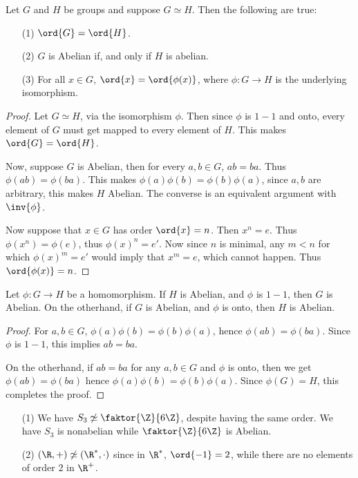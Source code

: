 \begin{lemma}\label{1.6.3}
    Let $G$ and  $H$ be groups and suppose  $G \simeq H$. Then the following are
    true:
    \begin{enumerate}
        \item[(1)] $\ord{G}=\ord{H}$.

        \item[(2)] $G$ is Abelian if, and only if  $H$ is abelian.

        \item [(3)] For all $x \in G$,  $\ord{x}=\ord{\phi(x)}$, where $\phi:G
            \rightarrow H$ is the underlying isomorphism.
    \end{enumerate}
\end{lemma}
\begin{proof}
    Let $G \simeq H$,  via the isomorphism  $\phi$. Then since $\phi$ is  $1-1$
    and onto, every element of  $G$ must get mapped to every element of  $H$.
    This makes  $\ord{G}=\ord{H}$.

    Now, suppose $G$ is Abelian, then for every  $a, b \in G$,  $ab=ba$. Thus
    $\phi(ab)=\phi(ba)$. This makes $\phi(a)\phi(b)=\phi(b)\phi(a)$, since $a,b$
    are arbitrary, this makes  $H$ Abelian. The converse is an equivalent
    argument with  $\inv{\phi}$.

    Now suppose that $x \in G$ has order  $\ord{x}=n$. Then $x^n=e$. Thus
    $\phi(x^n)=\phi(e)$, thus $\phi(x)^n=e'$. Now since $n$ is minimal, any
    $m<n$ for which  $\phi(x)^m=e'$ would imply that $x^m=e$, which cannot
    happen. Thus  $\ord{\phi(x)}=n$.
\end{proof}
\begin{corollary}
    Let $\phi:G \rightarrow H$ be a homomorphism. If $H$ is Abelian, and  $\phi$
    is  $1-1$, then  $G$ is Abelian. On the otherhand, if  $G$ is Abelian, and
    $\phi$ is onto, then  $H$ is Abelian.
\end{corollary}
\begin{proof}
    For $a,b \in G$,  $\phi(a)\phi(b)=\phi(b)\phi(a)$, hence
    $\phi(ab)=\phi(ba)$. Since $\phi$ is  $1-1$, this implies  $ab=ba$.

    On the otherhand, if $ab=ba$ for any  $a,b \in G$ and  $\phi$ is onto, then
    we get  $\phi(ab)=\phi(ba)$ hence $\phi(a)\phi(b)=\phi(b)\phi(a)$. Since
    $\phi(G)=H$, this completes the proof.
\end{proof}

\begin{example}
    \begin{enumerate}
        \item[(1)] We have $S_3 \not\simeq \faktor{\Z}{6\Z}$, despite having the
            same order. We have $S_3$ is nonabelian while  $\faktor{\Z}{6\Z}$ is
            Abelian.

        \item[(2)] $(\R,+) \not\simeq (\R^*, \cdot)$ since in $\R^*$,
            $\ord{-1}=2$, while there are no elements of order $2$ in  $\R^+$.
    \end{enumerate}
\end{example}

